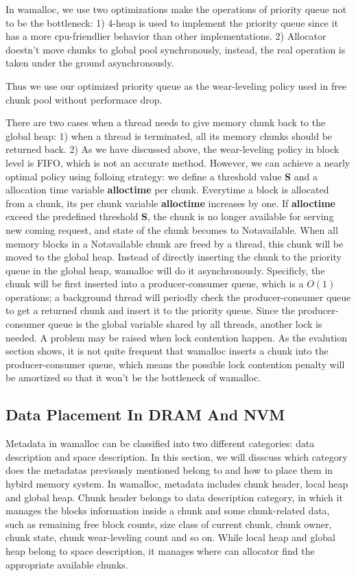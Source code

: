 \documentclass{vldb}
\begin{document}
In wamalloc, we use two optimizations make the operations of priority queue not to be the bottleneck:
1) 4-heap is used to implement the priority queue since it has a more cpu-friendlier behavior than other implementations.
2) Allocator doestn't move chunks to global pool synchronously, instead, the real operation is taken under the ground asynchronously.

Thus we use our optimized priority queue as the wear-leveling policy used in free chunk pool without performace drop.

There are two cases when a thread needs to give memory chunk back to the global heap: 
1) when a thread is terminated, all its memory chunks should be returned back.
2) As we have discussed above, the wear-leveling policy in block level is FIFO, which is not an accurate method.
However, we can achieve a nearly optimal policy using folloing strategy: 
we define a threshold value \textbf{S} and a allocation time variable \textbf{alloctime} per chunk. 
Everytime a block is allocated from a chunk, its per chunk variable \textbf{alloctime} increases by one.
If \textbf{alloctime} exceed the predefined threshold \textbf{S}, 
the chunk is no longer available for serving new coming request, and state of the chunk becomes to Notavailable.
When all memory blocks in a Notavailable chunk are freed by a thread, this chunk will be moved to the global heap.
Instead of directly inserting the chunk to the priority queue in the global heap, wamalloc will do it asynchronously.
Specificly, the chunk will be first inserted into a producer-consumer queue, which is a $O(1)$ operations;
a background thread will periodly check the producer-consumer queue to get a returned chunk and insert it to the priority queue.
Since the producer-consumer queue is the global variable shared by all threads, another lock is needed.
A problem may be raised when lock contention happen.
As the evalution section shows, it is not quite frequent that wamalloc inserts a chunk into the producer-consumer queue,
which means the possible lock contention penalty will be amortized so that it won't be the bottleneck of wamalloc.

\subsection{Data Placement In DRAM And NVM}

Metadata in wamalloc can be classified into two different categories: data description and space description.
In this section, we will disscuss which category does the metadatas previously mentioned belong to and how to place them in hybird memory system.
In wamalloc, metadata includes chunk header, local heap and global heap.
Chunk header belongs to data description category, in which it manages the blocks information inside a chunk and some chunk-related data, such as remaining free block counts, size class of current chunk, chunk owner, chunk state, chunk wear-leveling count and so on.
While local heap and global heap belong to space description, it manages where can allocator find the appropriate available chunks.
\end{document}
